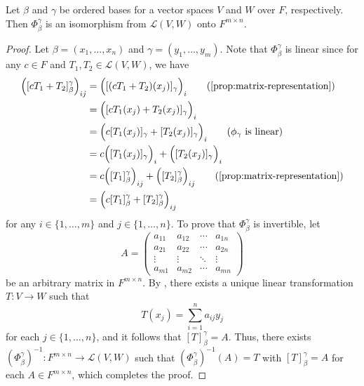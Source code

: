\begin{theorem}
  \label{thm:matrix-representation}
  Let $\beta$ and $\gamma$ be ordered bases for a vector spaces $V$ and $W$
  over $F$, respectively.
  Then $\Phi_\beta^\gamma$ is an isomorphism from $\mathcal{L}(V, W)$ onto
  $F^{m \times n}$.
\end{theorem}
\begin{proof}
  Let $\beta = (x_1, \dots, x_n)$ and $\gamma = (y_1, \dots, y_m)$.
  Note that $\Phi_\beta^\gamma$ is linear since for any $c \in F$ and
  $T_1, T_2 \in \mathcal{L}(V, W)$, we have
  \begin{align*}
    \Bigl([cT_1 + T_2]_\beta^\gamma\Bigr)_{ij}
    &= \Bigl([(cT_1 + T_2)(x_j)]_\gamma\Bigr)_i
       \tag{\Cref{prop:matrix-representation}} \\
    &= \Bigl([cT_1(x_j) + T_2(x_j)]_\gamma\Bigr)_i \\
    &= \Bigl(c[T_1(x_j)]_\gamma + [T_2(x_j)]_\gamma\Bigr)_i
       \tag{$\phi_\gamma$ is linear} \\
    &= c\Bigl([T_1(x_j)]_\gamma\Bigr)_i + \Bigl([T_2(x_j)]_\gamma\Bigr)_i \\
    &= c\Bigl([T_1]_\beta^\gamma\Bigr)_{ij}
       + \Bigl([T_2]_\beta^\gamma\Bigr)_{ij}
       \tag{\Cref{prop:matrix-representation}} \\
    &= \Bigl(c[T_1]_\beta^\gamma + [T_2]_\beta^\gamma\Bigr)_{ij}
  \end{align*}
  for any $i \in \{1, \dots, m\}$ and $j \in \{1, \dots, n\}$.
  To prove that $\Phi_\beta^\gamma$ is invertible, let
  \begin{equation*}
    A =
    \begin{pmatrix}
      a_{11} & a_{12} & \cdots & a_{1n} \\
      a_{21} & a_{22} & \cdots & a_{2n} \\
      \vdots & \vdots & \ddots & \vdots \\
      a_{m1} & a_{m2} & \cdots & a_{mn}
    \end{pmatrix}
  \end{equation*}
  be an arbitrary matrix in $F^{m \times n}$.
  By , there exists a unique linear transformation
  $T: V \to W$ such that
  \begin{equation*}
    T(x_j) = \sum_{i=1}^n a_{ij}y_j
  \end{equation*}
  for each $j \in \{1, \dots, n\}$, and it follows that $[T]_\beta^\gamma = A$.
  Thus, there exists
  $(\Phi_\beta^\gamma)^{-1}: F^{m \times n} \to \mathcal{L}(V, W)$
  such that $(\Phi_\beta^\gamma)^{-1}(A) = T$ with $[T]_\beta^\gamma = A$ for
  each $A \in F^{m \times n}$, which completes the proof.
\end{proof}

